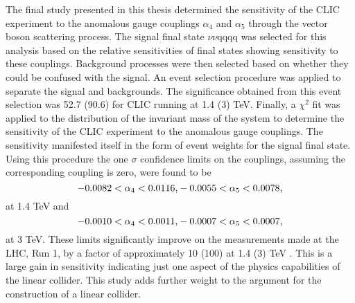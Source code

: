 The final study presented in this thesis determined the sensitivity of the CLIC experiment to the anomalous gauge couplings $\alpha_{4}$ and $\alpha_{5}$ through the vector boson scattering process.  The signal final state ${\nu}{\nu}$qqqq was selected for this analysis based on the relative sensitivities of final states showing sensitivity to these couplings.  Background processes were then selected based on whether they could be confused with the signal.  An event selection procedure was applied to separate the signal and backgrounds.  The significance obtained from this event selection was 52.7 (90.6) for CLIC running at 1.4 (3) TeV.  Finally, a $\chi^{2}$ fit was applied to the distribution of the invariant mass of the system to determine the sensitivity of the CLIC experiment to the anomalous gauge couplings.  The sensitivity manifested itself in the form of event weights for the signal final state.  Using this procedure the one $\sigma$ confidence limits on the couplings, assuming the corresponding coupling is zero, were found to be
%
\begin{equation}
-0.0082 < \alpha_{4} < 0.0116 \text{,} \\
-0.0055 < \alpha_{5} < 0.0078 \text{,}
\end{equation}
%
\noindent at 1.4 TeV and
%
\begin{equation}
-0.0010 < \alpha_{4} < 0.0011 \text{,} \\
-0.0007 < \alpha_{5} < 0.0007 \text{,}
\end{equation}
%
\noindent at 3 TeV.  These limits significantly improve on the measurements made at the LHC, Run 1, by a factor of approximately 10 (100) at 1.4 (3) TeV \cite{Green:2016trm}.  This is a large gain in sensitivity indicating just one aspect of the physics capabilities of the linear collider.  This study adds further weight to the argument for the construction of a linear collider.   

